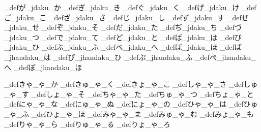 \brl@char_def{が}{\brl@char@alias_jdaku\brl@char@alias_か}
\brl@char_def{ぎ}{\brl@char@alias_jdaku\brl@char@alias_き}
\brl@char_def{ぐ}{\brl@char@alias_jdaku\brl@char@alias_く}
\brl@char_def{げ}{\brl@char@alias_jdaku\brl@char@alias_け}
\brl@char_def{ご}{\brl@char@alias_jdaku\brl@char@alias_こ}
\brl@char_def{ざ}{\brl@char@alias_jdaku\brl@char@alias_さ}
\brl@char_def{じ}{\brl@char@alias_jdaku\brl@char@alias_し}
\brl@char_def{ず}{\brl@char@alias_jdaku\brl@char@alias_す}
\brl@char_def{ぜ}{\brl@char@alias_jdaku\brl@char@alias_せ}
\brl@char_def{ぞ}{\brl@char@alias_jdaku\brl@char@alias_そ}
\brl@char_def{だ}{\brl@char@alias_jdaku\brl@char@alias_た}
\brl@char_def{ぢ}{\brl@char@alias_jdaku\brl@char@alias_ち}
\brl@char_def{づ}{\brl@char@alias_jdaku\brl@char@alias_つ}
\brl@char_def{で}{\brl@char@alias_jdaku\brl@char@alias_て}
\brl@char_def{ど}{\brl@char@alias_jdaku\brl@char@alias_と}
\brl@char_def{ば}{\brl@char@alias_jdaku\brl@char@alias_は}
\brl@char_def{び}{\brl@char@alias_jdaku\brl@char@alias_ひ}
\brl@char_def{ぶ}{\brl@char@alias_jdaku\brl@char@alias_ふ}
\brl@char_def{べ}{\brl@char@alias_jdaku\brl@char@alias_へ}
\brl@char_def{ぼ}{\brl@char@alias_jdaku\brl@char@alias_ほ}
\brl@char_def{ぱ}{\brl@char@alias_jhandaku\brl@char@alias_は}
\brl@char_def{ぴ}{\brl@char@alias_jhandaku\brl@char@alias_ひ}
\brl@char_def{ぷ}{\brl@char@alias_jhandaku\brl@char@alias_ふ}
\brl@char_def{ぺ}{\brl@char@alias_jhandaku\brl@char@alias_へ}
\brl@char_def{ぽ}{\brl@char@alias_jhandaku\brl@char@alias_ほ}


\brl@char_def{きゃ}{\brl@char@alias_ゃ\brl@char@alias_か}
\brl@char_def{きゅ}{\brl@char@alias_ゃ\brl@char@alias_く}
\brl@char_def{きょ}{\brl@char@alias_ゃ\brl@char@alias_こ}
\brl@char_def{しゃ}{\brl@char@alias_ゃ\brl@char@alias_さ}
\brl@char_def{しゅ}{\brl@char@alias_ゃ\brl@char@alias_す}
\brl@char_def{しょ}{\brl@char@alias_ゃ\brl@char@alias_そ}
\brl@char_def{ちゃ}{\brl@char@alias_ゃ\brl@char@alias_た}
\brl@char_def{ちゅ}{\brl@char@alias_ゃ\brl@char@alias_つ}
\brl@char_def{ちょ}{\brl@char@alias_ゃ\brl@char@alias_と}
\brl@char_def{にゃ}{\brl@char@alias_ゃ\brl@char@alias_な}
\brl@char_def{にゅ}{\brl@char@alias_ゃ\brl@char@alias_ぬ}
\brl@char_def{にょ}{\brl@char@alias_ゃ\brl@char@alias_の}
\brl@char_def{ひゃ}{\brl@char@alias_ゃ\brl@char@alias_は}
\brl@char_def{ひゅ}{\brl@char@alias_ゃ\brl@char@alias_ふ}
\brl@char_def{ひょ}{\brl@char@alias_ゃ\brl@char@alias_ほ}
\brl@char_def{みゃ}{\brl@char@alias_ゃ\brl@char@alias_ま}
\brl@char_def{みゅ}{\brl@char@alias_ゃ\brl@char@alias_む}
\brl@char_def{みょ}{\brl@char@alias_ゃ\brl@char@alias_も}
\brl@char_def{りゃ}{\brl@char@alias_ゃ\brl@char@alias_ら}
\brl@char_def{りゅ}{\brl@char@alias_ゃ\brl@char@alias_る}
\brl@char_def{りょ}{\brl@char@alias_ゃ\brl@char@alias_ろ}


